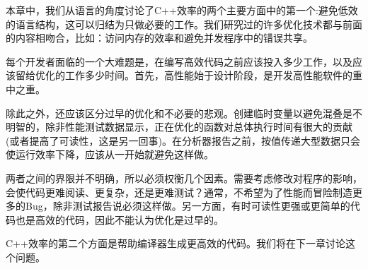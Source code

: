 本章中，我们从语言的角度讨论了C++效率的两个主要方面中的第一个:避免低效的语言结构，这可以归结为只做必要的工作。我们研究过的许多优化技术都与前面的内容相吻合，比如：访问内存的效率和避免并发程序中的错误共享。

每个开发者面临的一个大难题是，在编写高效代码之前应该投入多少工作，以及应该留给优化的工作多少时间。首先，高性能始于设计阶段，是开发高性能软件的重中之重。 

除此之外，还应该区分过早的优化和不必要的悲观。创建临时变量以避免混叠是不明智的，除非性能测试数据显示，正在优化的函数对总体执行时间有很大的贡献(或者提高了可读性，这是另一回事)。在分析器报告之前，按值传递大型数据只会使运行效率下降，应该从一开始就避免这样做。 

两者之间的界限并不明确，所以必须权衡几个因素。需要考虑修改对程序的影响，会使代码更难阅读、更复杂，还是更难测试？通常，不希望为了性能而冒险制造更多的Bug，除非测试报告说必须这样做。另一方面，有时可读性更强或更简单的代码也是高效的代码，因此不能认为优化是过早的。 

C++效率的第二个方面是帮助编译器生成更高效的代码。我们将在下一章讨论这个问题。